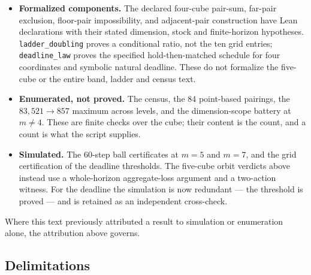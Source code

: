 \documentclass[10pt,twocolumn]{article}
\theoremstyle{plain}
\theoremstyle{definition}
\theoremstyle{remark}
\begin{document}
\begin{itemize}
\item \textbf{Formalized components.} The declared four-cube
pair-sum, far-pair exclusion, floor-pair impossibility, and adjacent-pair
construction have Lean declarations with their stated dimension, stock
and finite-horizon hypotheses. \texttt{ladder\_doubling} proves a
conditional ratio, not the ten grid entries; \texttt{deadline\_law}
proves the specified hold-then-matched schedule for four coordinates
and symbolic natural deadline. These do not formalize the five-cube or
the entire band, ladder and census text.

\item \textbf{Enumerated, not proved.} The census, the \(84\)
point-based pairings, the \(83{,}521 \to 857\) maximum across levels, and the
dimension-scope battery at \(m \ne 4\). These are finite checks over
the cube; their content is the count, and a count is what the script
supplies.

\item \textbf{Simulated.} The \(60\)-step ball certificates at
\(m = 5\) and \(m = 7\), and the grid certification of the deadline
thresholds. The five-cube orbit verdicts above instead use a
whole-horizon aggregate-loss argument and a two-action witness. For the deadline the simulation is now redundant --- the
threshold is proved --- and is retained as an independent cross-check.
\end{itemize}

\noindent Where this text previously attributed a result to simulation
or enumeration alone, the attribution above governs.

\subsection{Delimitations}\label{scale-scope}
\end{document}
